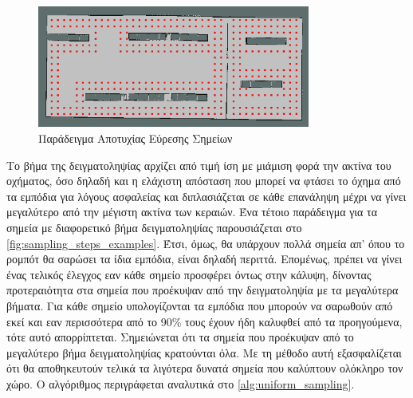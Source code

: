 \begin{figure}[!htb]
    \centering
    \includegraphics[width=0.8\textwidth]{./images/chapter5/sampling_double_points_example.png}
    \caption{Παράδειγμα Αποτυχίας Εύρεσης Σημείων}
    \label{fig:sampling_double_points_example}
\end{figure}


Το βήμα της δειγματοληψίας αρχίζει από τιμή ίση με μιάμιση φορά την ακτίνα του οχήματος, όσο δηλαδή και η ελάχιστη απόσταση που μπορεί να φτάσει το όχημα από τα εμπόδια για λόγους ασφαλείας και διπλασιάζεται σε κάθε επανάληψη μέχρι να γίνει μεγαλύτερο από την μέγιστη ακτίνα των κεραιών. Ένα τέτοιο παράδειγμα για τα σημεία με διαφορετικό βήμα δειγματοληψίας παρουσιάζεται στο \ref{fig:sampling_steps_examples}. Έτσι, όμως, θα υπάρχουν πολλά σημεία απ' όπου το ρομπότ θα σαρώσει τα ίδια εμπόδια, είναι δηλαδή περιττά. Επομένως, πρέπει να γίνει ένας τελικός έλεγχος εαν κάθε σημείο προσφέρει όντως στην κάλυψη, δίνοντας προτεραιότητα στα σημεία που προέκυψαν από την δειγματοληψία με τα μεγαλύτερα βήματα. Για κάθε σημείο υπολογίζονται τα εμπόδια που μπορούν να σαρωθούν από εκεί και εαν περισσότερα από το 90\% τους έχουν ήδη καλυφθεί από τα προηγούμενα, τότε αυτό απορρίπτεται. Σημειώνεται ότι τα σημεία που προέκυψαν από το μεγαλύτερο βήμα δειγματοληψίας κρατούνται όλα. Με τη μέθοδο αυτή εξασφαλίζεται ότι θα αποθηκευτούν τελικά τα λιγότερα δυνατά σημεία που καλύπτουν ολόκληρο τον χώρο. Ο αλγόριθμος περιγράφεται αναλυτικά στο \ref{alg:uniform_sampling}.


